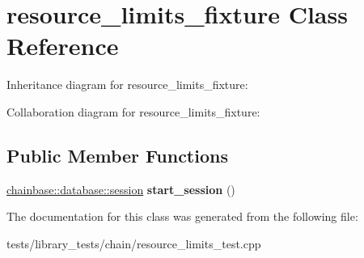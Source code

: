\hypertarget{classresource__limits__fixture}{}\section{resource\+\_\+limits\+\_\+fixture Class Reference}
\label{classresource__limits__fixture}


Inheritance diagram for resource\+\_\+limits\+\_\+fixture\+:


Collaboration diagram for resource\+\_\+limits\+\_\+fixture\+:
\subsection*{Public Member Functions}
\begin{DoxyCompactItemize}
\item 
\mbox{\label{classresource__limits__fixture_aeccfdc59606937fb2d060f9bb0de58cf}} 
\mbox{\hyperlink{structchainbase_1_1database_1_1session}{chainbase\+::database\+::session}} {\bfseries start\+\_\+session} ()
\end{DoxyCompactItemize}


The documentation for this class was generated from the following file\+:\begin{DoxyCompactItemize}
\item 
tests/library\+\_\+tests/chain/resource\+\_\+limits\+\_\+test.\+cpp\end{DoxyCompactItemize}
